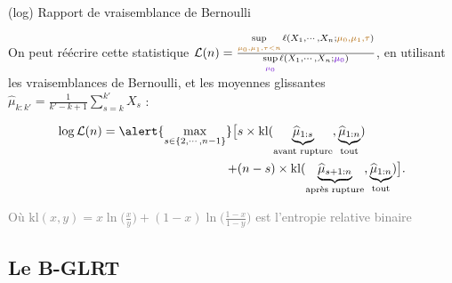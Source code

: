 \documentclass[11pt,french,ignorenonframetext,]{beamer}
\begin{document}
\begin{frame}{(log) Rapport de vraisemblance de Bernoulli}

  On peut réécrire cette statistique
  $\mathcal{L}(n) = \frac{\sup\limits_{\textcolor{gold}{\mu_0,\mu_1,\tau < n}}\ell(X_1,\cdots,X_n ; \textcolor{gold}{\mu_0,\mu_1,\tau})}{\sup\limits_{\textcolor{deeppurple}{\mu_0}}\ell(X_1,\cdots,X_n ;\textcolor{deeppurple}{\mu_0})}$,
  en utilisant les vraisemblances de Bernoulli, et les moyennes glissantes $\widehat{\mu}_{k:k'} = \frac{1}{k'-k+1} \sum\limits_{s=k}^{k'} X_s$ :

  \begin{align*}
    \log \mathcal{L}(n) = \alert{\max_{s \in \{2,\cdots,n-1\}}} \bigl[
      & s \times \mathrm{kl} (\underbrace{\widehat{\mu}_{1:s}}_{\text{avant rupture}},\underbrace{\widehat{\mu}_{1:n}}_{\text{tout}} ) \\
      + & (n-s) \times \mathrm{kl} (\underbrace{\widehat{\mu}_{s+1:n}}_{\text{après rupture}},\underbrace{\widehat{\mu}_{1:n}}_{\text{tout}} ) \bigr].
  \end{align*}

  \begin{small}
    \textcolor{gray}{Où $\mathrm{kl}(x,y) =x \ln\bigl(\frac{x}{y}\bigr) + (1-x)\ln\bigl(\frac{1-x}{1-y}\bigr)$ est l'entropie relative binaire}
  \end{small}

\end{frame}


\subsection{\hfill{}Le B-GLRT\hfill{}}
\end{document}
